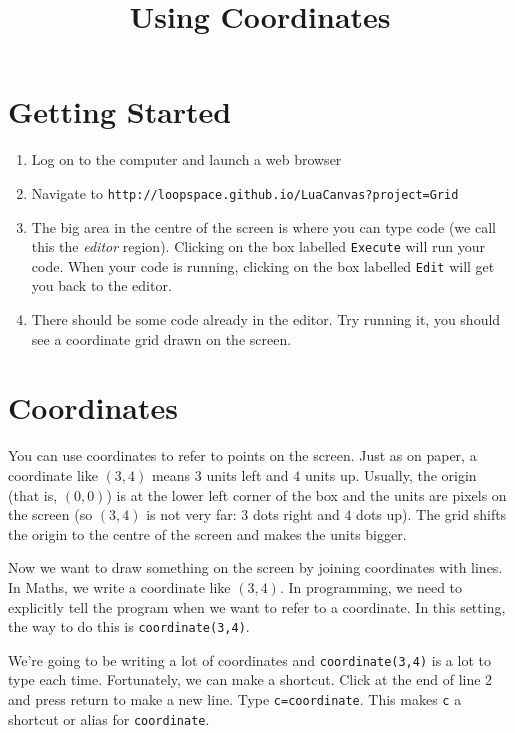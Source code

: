 \documentclass[
  xhtml,%
  text
]{internet}
\title{Using Coordinates}
\begin{document}
\maketitle
\section*{Getting Started}

\begin{enumerate}
\item Log on to the computer and launch a web browser
\item Navigate to \verb+http://loopspace.github.io/LuaCanvas?project=Grid+
\item The big area in the centre of the screen is where you can type code (we call this the \emph{editor} region).
Clicking on the box labelled \verb+Execute+ will run your code.
When your code is running, clicking on the box labelled \verb+Edit+ will get you back to the editor.

\item There should be some code already in the editor.
Try running it, you should see a coordinate grid drawn on the screen.
\end{enumerate}

\section*{Coordinates}

You can use coordinates to refer to points on the screen.
Just as on paper, a coordinate like \((3,4)\) means \(3\) units left and \(4\) units up.
Usually, the origin (that is, \((0,0)\)) is at the lower left corner of the box and the units are pixels on the screen (so \((3,4)\) is not very far: \(3\) dots right and \(4\) dots up).
The grid shifts the origin to the centre of the screen and makes the units bigger.

Now we want to draw something on the screen by joining coordinates with lines.
In Maths, we write a coordinate like \((3,4)\).
In programming, we need to explicitly tell the program when we want to refer to a coordinate.
In this setting, the way to do this is \verb+coordinate(3,4)+.

We're going to be writing a lot of coordinates and \verb+coordinate(3,4)+ is a lot to type each time.
Fortunately, we can make a shortcut.
Click at the end of line 2 and press return to make a new line.
Type \verb+c=coordinate+.
This makes \verb+c+ a shortcut or alias for \verb+coordinate+.
\end{document}
